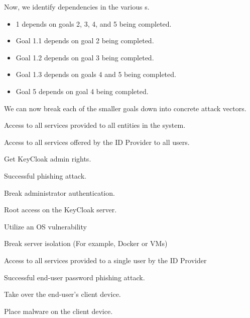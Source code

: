 Now, we identify dependencies in the various s.
\begin{itemize}[noitemsep]
\item {} 1 depends on goals 2, 3, 4, and 5 being completed.
\item Goal 1.1 depends on goal 2 being completed.
\item Goal 1.2 depends on goal 3 being completed.
\item Goal 1.3 depends on goals 4 and 5 being completed.
\item Goal 5 depends on goal 4 being completed.
\end{itemize}

We can now break each of the smaller goals down into concrete attack vectors.
\begin{nestednums}
\item Access to all services provided to all entities in the system.
  \begin{nestednums}
  \item Access to all services offered by the ID Provider to all users.
    \begin{nestednums}
    \item Get KeyCloak admin rights.
      \begin{nestednums}
      \item Successful phishing attack.
      \item Break administrator authentication.
      \end{nestednums}
    \item Root access on the KeyCloak server.
      \begin{nestednums}
      \item Utilize an OS vulnerability
      \item Break server isolation (For example, Docker or VMs)
      \end{nestednums}
    \end{nestednums}
  \end{nestednums}
\item Access to all services provided to a single user by the ID Provider
  \begin{nestednums}
  \item Successful end-user password phishing attack.
  \item Take over the end-user's client device.
    \begin{nestednums}
    \item Place malware on the client device.

\end{nestednums}
\end{nestednums}
\end{nestednums}
